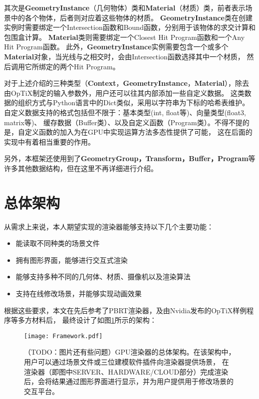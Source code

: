 \label{GeometryInstance}
其次是\textbf{GeometryInstance}（几何物体）类和\textbf{Material}（材质）类，前者表示场景中的各个物体，后者则对应着这些物体的材质。
\textbf{GeometryInstance}类在创建实例时需要绑定一个Intersection函数和Bound函数，分别用于该物体的求交计算和包围盒计算。
\textbf{Material}类则需要绑定一个Closest Hit Program函数和一个Any Hit Program函数。
此外，\textbf{GeometryInstance}实例需要包含一个或多个\textbf{Material}对象，当光线与之相交时，会由Intersection函数选择其中一个材质，
然后调用它所绑定的两个Hit Program。

对于上述介绍的三种类型（\textbf{Context}，\textbf{GeometryInstance}，\textbf{Material}），除去由OpTiX制定的输入参数外，用户还可以往其内部添加一些自定义数据。
这类数据的组织方式与Python语言中的Dict类似，采用以字符串为下标的哈希表维护。
自定义数据支持的格式包括但不限于：基本类型(int, float等)、向量类型(float3, matrix等)、
缓存数据（Buffer类）、以及自定义函数（Program类）。不得不提的是，自定义函数的加入为在GPU中实现运算方法多态性提供了可能，
这在后面的实现中有着相当重要的作用。

另外，本框架还使用到了\textbf{GeometryGroup，Transform，Buffer，Program}等许多其他数据结构，但在这里不再详细进行介绍。

\section{总体架构}
 
从需求上来说，本人期望实现的渲染器能够支持以下几个主要功能：

\begin{itemize}
    \item{能读取不同种类的场景文件}
    \item{拥有图形界面，能够进行交互式渲染}
    \item{能够支持多种不同的几何体、材质、摄像机以及渲染算法}
    \item{支持在线修改场景，并能够实现动画效果}
\end{itemize}

根据这些要求，本文在先后参考了PBRT\cite{pharr2016physically}渲染器，及由Nvidia发布的OpTiX样例程序等多方材料后，
最终设计了如图\ref{tab:framework}所示的架构：


\begin{figure}[h]
    \centering
    \texttt{[image: Framework.pdf]}
    \caption{（TODO：图片还有些问题）GPU渲染器的总体架构。在该架构中，用户可以通过场景文件或三位建模软件插件向渲染器提供场景，
    在渲染器（即图中SERVER、HARDWARE/CLOUD部分）完成渲染后，会将结果通过图形界面进行显示，并为用户提供用于修改场景的交互平台。}
    \label{tab:framework}
\end{figure}

